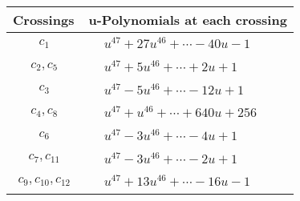\documentclass[1p]{elsarticle_modified}
\theoremstyle{definition}
\begin{document}
\begin{tabular}{m{50pt}|m{274pt}}
Crossings & \hspace{64pt}u-Polynomials at each crossing \\
\hline $$\begin{aligned}c_{1}\end{aligned}$$&$\begin{aligned}
&u^{47}+27 u^{46}+\cdots-40 u-1
\end{aligned}$\\
\hline $$\begin{aligned}c_{2},c_{5}\end{aligned}$$&$\begin{aligned}
&u^{47}+5 u^{46}+\cdots+2 u+1
\end{aligned}$\\
\hline $$\begin{aligned}c_{3}\end{aligned}$$&$\begin{aligned}
&u^{47}-5 u^{46}+\cdots-12 u+1
\end{aligned}$\\
\hline $$\begin{aligned}c_{4},c_{8}\end{aligned}$$&$\begin{aligned}
&u^{47}+u^{46}+\cdots+640 u+256
\end{aligned}$\\
\hline $$\begin{aligned}c_{6}\end{aligned}$$&$\begin{aligned}
&u^{47}-3 u^{46}+\cdots-4 u+1
\end{aligned}$\\
\hline $$\begin{aligned}c_{7},c_{11}\end{aligned}$$&$\begin{aligned}
&u^{47}-3 u^{46}+\cdots-2 u+1
\end{aligned}$\\
\hline $$\begin{aligned}c_{9},c_{10},c_{12}\end{aligned}$$&$\begin{aligned}
&u^{47}+13 u^{46}+\cdots-16 u-1
\end{aligned}$\\
\hline
\end{tabular}\\~\\
\newpage\renewcommand{\arraystretch}{1}
\end{document}

